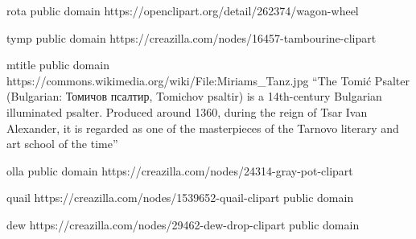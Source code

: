 rota
public domain
https://openclipart.org/detail/262374/wagon-wheel

tymp
public domain
https://creazilla.com/nodes/16457-tambourine-clipart

mtitle
public domain
https://commons.wikimedia.org/wiki/File:Miriams_Tanz.jpg
``The Tomić Psalter (Bulgarian: Томичов псалтир, Tomichov psaltir) is a 14th-century Bulgarian illuminated psalter. Produced around 1360, during the reign of Tsar Ivan Alexander, it is regarded as one of the masterpieces of the Tarnovo literary and art school of the time''

olla
public domain
https://creazilla.com/nodes/24314-gray-pot-clipart

quail
https://creazilla.com/nodes/1539652-quail-clipart
public domain

dew
https://creazilla.com/nodes/29462-dew-drop-clipart
public domain
